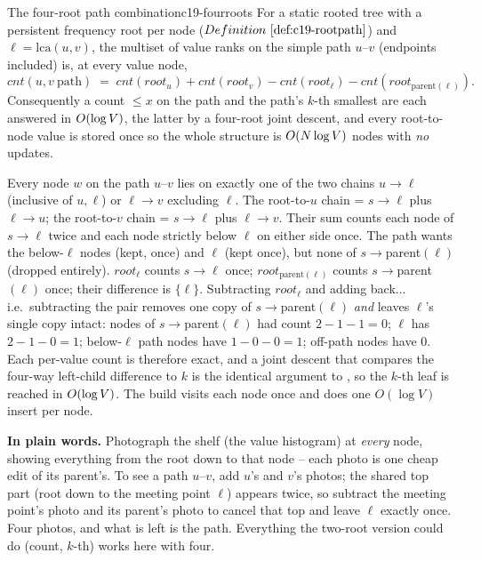 \begin{proposition}{The four-root path combination}{c19-fourroots}
For a static rooted tree with a persistent frequency root per node (\(\defref{c19-rootpath}\)) and \(\ell=\mathrm{lca}(u,v)\), the multiset of value ranks on the simple path \(u\text{--}v\) (endpoints included) is, at every value node,
\[
  \mathit{cnt}(u,v\ \text{path}) \;=\; \mathit{cnt}(\mathit{root}_u)+\mathit{cnt}(\mathit{root}_v)-\mathit{cnt}(\mathit{root}_{\ell})-\mathit{cnt}(\mathit{root}_{\mathrm{parent}(\ell)}).
\]
Consequently a count \(\le x\) on the path and the path's \(k\)-th smallest are each answered in \(O(\log V)\), the latter by a four-root joint descent, and every root-to-node value is stored once so the whole structure is \(O(N\log V)\) nodes with \emph{no} updates.
\end{proposition}
\begin{proofbox}
Every node \(w\) on the path \(u\text{--}v\) lies on exactly one of the two chains \(u\to\ell\) (inclusive of \(u,\ell\)) or \(\ell\to v\) excluding \(\ell\). The root-to-\(u\) chain = \(s\to\ell\) plus \(\ell\to u\); the root-to-\(v\) chain = \(s\to\ell\) plus \(\ell\to v\). Their sum counts each node of \(s\to\ell\) twice and each node strictly below \(\ell\) on either side once. The path wants the below-\(\ell\) nodes (kept, once) and \(\ell\) (kept once), but none of \(s\to\)parent\((\ell)\) (dropped entirely). \(\mathit{root}_\ell\) counts \(s\to\ell\) once; \(\mathit{root}_{\mathrm{parent}(\ell)}\) counts \(s\to\)parent\((\ell)\) once; their difference is \(\{\ell\}\). Subtracting \(\mathit{root}_\ell\) and adding back... i.e.\ subtracting the pair removes one copy of \(s\to\)parent\((\ell)\) \emph{and} leaves \(\ell\)'s single copy intact: nodes of \(s\to\)parent\((\ell)\) had count \(2-1-1=0\); \(\ell\) has \(2-1-0=1\); below-\(\ell\) path nodes have \(1-0-0=1\); off-path nodes have \(0\). Each per-value count is therefore exact, and a joint descent that compares the four-way left-child difference to \(k\) is the identical argument to , so the \(k\)-th leaf is reached in \(O(\log V)\). The build visits each node once and does one \(O(\log V)\) insert per node.
\end{proofbox}

\noindent\textbf{In plain words.}  Photograph the shelf (the value histogram) at \emph{every} node, showing everything from the root down to that node -- each photo is one cheap edit of its parent's. To see a path \(u\text{--}v\), add \(u\)'s and \(v\)'s photos; the shared top part (root down to the meeting point \(\ell\)) appears twice, so subtract the meeting point's photo and its parent's photo to cancel that top and leave \(\ell\) exactly once. Four photos, and what is left is the path. Everything the two-root version could do (count, \(k\)-th) works here with four.

